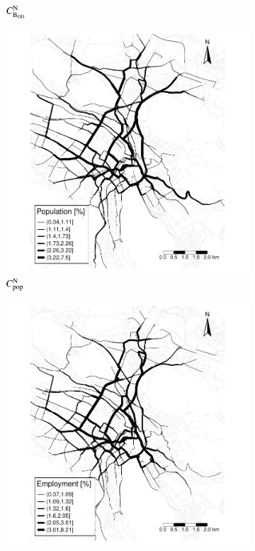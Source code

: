 \documentclass[]{elsarticle} %
\begin{document}
\begin{figure}
\begin{subfigure}{.5\textwidth}
  \caption{$C_{\rm B_{OD}}^{\rm N}$}
\end{subfigure}
 \begin{subfigure}{.5\textwidth}
  \centering
  \includegraphics[width=1\linewidth]{Plots/empl_acc_pop_center.pdf}  
  \caption{$C_{\rm pop}^{\rm N}$}
\end{subfigure}
\begin{subfigure}{.5\textwidth}
  \centering
  \includegraphics[width=1\linewidth]{Plots/pop_acc_empl_center.pdf}  

\end{subfigure}
\end{figure}
\end{document}

